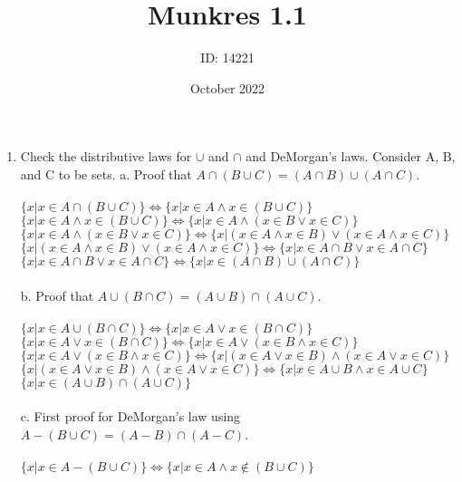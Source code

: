 \documentclass[]{article}
\date{October 2022}
\author{ID: 14221}
\title{Munkres 1.1}
\begin{document}
\maketitle

\begin{enumerate}
    \item  Check the distributive laws for $\cup$ and $\cap$ and DeMorgan's laws.
    \newline Consider A, B, and C to be sets. 
    \newline a. 
    \newline Proof that $A \cap (B \cup C)=(A\cap B)\cup(A\cap C)$.
    \\\\$\{x|x \in A\cap(B\cup C)\} \iff \{x|x\in A \land x\in (B \cup C)\}$
    \newline $\{x|x\in A \land x\in (B \cup C)\} \iff \{x|x \in A \land (x \in B \lor x \in C)\}$
    \newline $\{x|x \in A \land (x \in B \lor x \in C)\} \iff \{x|(x\in A \land x \in B)\lor(x\in A \land x \in C)\}$
    \newline $\{x|(x\in A \land x \in B)\lor(x\in A \land x \in C)\} \iff \{x|x \in A \cap B \lor x \in A \cap C\}$
    \newline $\{x|x \in A \cap B \lor x \in A \cap C\} \iff \{x|x \in (A \cap B) \cup (A \cap C)\}$
    \\\\b.
    \newline Proof that $A \cup (B \cap C)=(A \cup B)\cap(A \cup C)$.
    \\\\$\{x|x \in A \cup (B \cap C)\} \iff \{x|x \in A \lor x \in (B \cap C)\}$
    \newline $\{x|x \in A \lor x \in (B \cap C)\} \iff \{x|x \in A \lor (x \in B \land x \in C)\}$
    \newline $\{x|x \in A \lor (x \in B \land x \in C)\} \iff \{x|(x \in A \lor x \in B) \land (x \in A \lor x \in C)\}$
    \newline $\{x|(x \in A \lor x \in B) \land (x \in A \lor x \in C)\} \iff \{x|x \in A \cup B \land x \in A \cup C\}$
    \newline $\{x|x \in (A \cup B) \cap (A \cup C)\}$
    \\\\c.
    \newline First proof for DeMorgan's law using $A - (B \cup C) = (A - B) \cap (A - C)$.
    \\\\$\{x|x \in A - (B \cup C)\} \iff \{x|x \in A \land x \notin (B \cup C)\}$

\end{enumerate}
\end{document}
